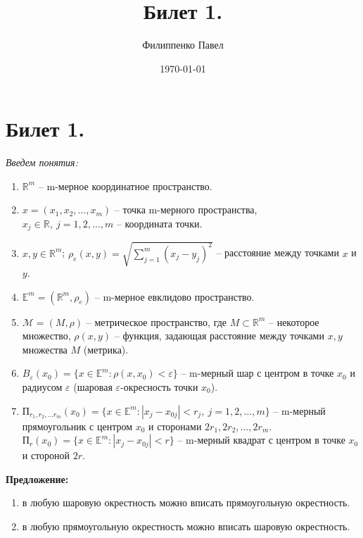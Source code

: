 \documentclass[a4paper,12pt]{article} %
\author{Филиппенко Павел}
\title{Билет 1.}
\date{\today}
\begin{document}

\maketitle
\newpage

\section*{Билет 1.}

\noindent \textit{Введем понятия:}\\[0.5 cm]

\begin{enumerate}
    \item $\mathbb{R}^m$ -- m-мерное координатное пространство.
    \item $x = (x_1, x_2, \dots, x_m)$ -- точка m-мерного пространства, ~ \\ $x_j \in \mathbb{R}, ~
    j = 1, 2, \dots, m$ -- координата точки.
    \item $x, y \in \mathbb{R}^m$; $\rho_e(x, y) = \sqrt{\sum_{j = 1}^m (x_j - y_j)^2}$ -- расстояние между точками $x$ и $y$.
    \item $\mathbb{E}^m = (\mathbb{R}^m, \rho_e)$ -- m-мерное евклидово пространство.
    \item $\mathscr{M} = (M, \rho)$ -- метрическое пространство, где $M \subset \mathbb{R}^m$ -- некоторое множество, $\rho(x, y)$ -- функция, задающая расстояние между точками $x, y$ множества $M$ (метрика).
    \item $B_{\varepsilon}(x_0) = \{x \in \mathbb{E}^m : \rho(x, x_0) < \varepsilon \}$ -- m-мерный шар с центром в точке $x_0$ и радиусом $\varepsilon$ (шаровая $\varepsilon$-окресность точки $x_0$).
    \item $\text{П}_{r_1, r_2, \dots r_m}(x_0) = \{ x \in \mathbb{E}^m : |x_j - x_{0j}| < r_j, ~ j = 1, 2, \dots, m \}$ -- m-мерный прямоугольник с центром $x_0$ и сторонами $2r_1, 2r_2, \dots, 2r_m$.\\
    
    $\text{П}_r(x_0) = \{ x \in \mathbb{E}^m : |x_j - x_{0j}| < r \}$ -- m-мерный квадрат с центром в точке $x_0$ и стороной $2r$.
\end{enumerate}

\noindent \textbf{Предложение:}

\begin{enumerate}
    \item в любую шаровую окрестность можно вписать прямоугольную окрестность.
    \item в любую прямоугольную окрестность можно вписать шаровую окрестность.
\end{enumerate}
\end{document}
